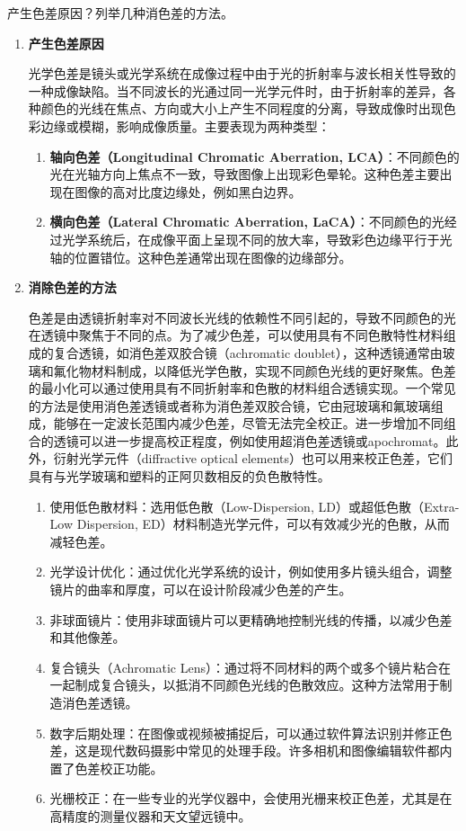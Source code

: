 \documentclass[dvipsnames, svgnames,a4paper,11pt]{article}
\begin{document}
	\begin{question}
		产生色差原因？列举几种消色差的方法。
	\end{question}
	\begin{enumerate}
		\item \textbf{产生色差原因}
		
		光学色差是镜头或光学系统在成像过程中由于光的折射率与波长相关性导致的一种成像缺陷。当不同波长的光通过同一光学元件时，由于折射率的差异，各种颜色的光线在焦点、方向或大小上产生不同程度的分离，导致成像时出现色彩边缘或模糊，影响成像质量。主要表现为两种类型：
		\begin{enumerate}
			\item \textbf{轴向色差（Longitudinal Chromatic Aberration, LCA）}：不同颜色的光在光轴方向上焦点不一致，导致图像上出现彩色晕轮。这种色差主要出现在图像的高对比度边缘处，例如黑白边界。
			\item \textbf{横向色差（Lateral Chromatic Aberration, LaCA）}：不同颜色的光经过光学系统后，在成像平面上呈现不同的放大率，导致彩色边缘平行于光轴的位置错位。这种色差通常出现在图像的边缘部分。
		\end{enumerate}
		
		\item \textbf{消除色差的方法}
		
		色差是由透镜折射率对不同波长光线的依赖性不同引起的，导致不同颜色的光在透镜中聚焦于不同的点。为了减少色差，可以使用具有不同色散特性材料组成的复合透镜，如消色差双胶合镜（achromatic doublet），这种透镜通常由玻璃和氟化物材料制成，以降低光学色散，实现不同颜色光线的更好聚焦。色差的最小化可以通过使用具有不同折射率和色散的材料组合透镜实现。一个常见的方法是使用消色差透镜或者称为消色差双胶合镜，它由冠玻璃和氟玻璃组成，能够在一定波长范围内减少色差，尽管无法完全校正。进一步增加不同组合的透镜可以进一步提高校正程度，例如使用超消色差透镜或apochromat。此外，衍射光学元件（diffractive optical elements）也可以用来校正色差，它们具有与光学玻璃和塑料的正阿贝数相反的负色散特性。
		
		\begin{enumerate}
			\item 使用低色散材料：选用低色散（Low-Dispersion, LD）或超低色散（Extra-Low Dispersion, ED）材料制造光学元件，可以有效减少光的色散，从而减轻色差。
			\item 光学设计优化：通过优化光学系统的设计，例如使用多片镜头组合，调整镜片的曲率和厚度，可以在设计阶段减少色差的产生。
			\item 非球面镜片：使用非球面镜片可以更精确地控制光线的传播，以减少色差和其他像差。
			\item 复合镜头（Achromatic Lens）：通过将不同材料的两个或多个镜片粘合在一起制成复合镜头，以抵消不同颜色光线的色散效应。这种方法常用于制造消色差透镜。
			\item 数字后期处理：在图像或视频被捕捉后，可以通过软件算法识别并修正色差，这是现代数码摄影中常见的处理手段。许多相机和图像编辑软件都内置了色差校正功能。
			\item 光栅校正：在一些专业的光学仪器中，会使用光栅来校正色差，尤其是在高精度的测量仪器和天文望远镜中。
		\end{enumerate}
		

\end{enumerate}
\end{document}
